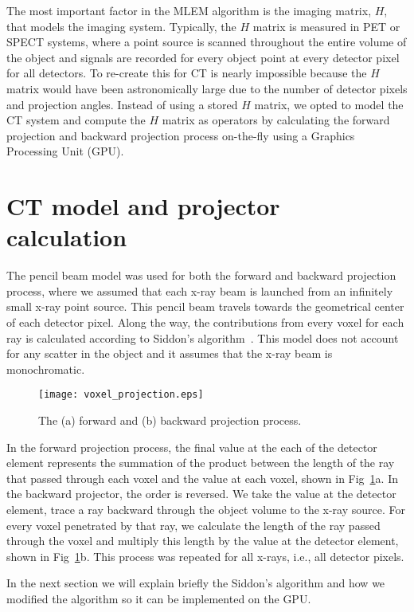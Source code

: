 The most important factor in the MLEM algorithm is the imaging matrix, $H$, that models the imaging system.  Typically, the $H$ matrix is measured in PET or SPECT systems, where a point source is scanned throughout the entire volume of the object and signals are recorded for every object point at every detector pixel for all detectors.  To re-create this for CT is nearly impossible because the $H$ matrix would have been astronomically large due to the number of detector pixels and projection angles.  Instead of using a stored $H$ matrix, we opted to model the CT system and compute the $H$ matrix as operators by calculating the forward projection and backward projection process on-the-fly using a Graphics Processing Unit (GPU).

\section{CT model and projector calculation}
The pencil beam model was used for both the forward and backward projection process, where we assumed that each x-ray beam is launched from an infinitely small x-ray point source. This pencil beam travels towards the geometrical center of each detector pixel.  Along the way, the contributions from every voxel for each ray is calculated according to Siddon's algorithm~\cite{Siddon1985}.  This model does not account for any scatter in the object and it assumes that the x-ray beam is monochromatic.

\begin{figure}[h]
\centering
\texttt{[image: voxel\_projection.eps]}
\caption{The (a) forward and (b) backward projection process.}
\label{fig:voxel_projection}
\end{figure}

In the forward projection process, the final value at the each of the detector element represents the summation of the product between the length of the ray that passed through each voxel and the value at each voxel, shown in Fig~\ref{fig:voxel_projection}a.  In the backward projector, the order is reversed. We take the value at the detector element, trace a ray backward through the object volume to the x-ray source.  For every voxel penetrated by that ray, we calculate the length of the ray passed through the voxel and multiply this length by the value at the detector element, shown in Fig~\ref{fig:voxel_projection}b.  This process was repeated for all x-rays, i.e., all detector pixels.

In the next section we will explain briefly the Siddon's algorithm and how we modified the algorithm so it can be implemented on the GPU. 

